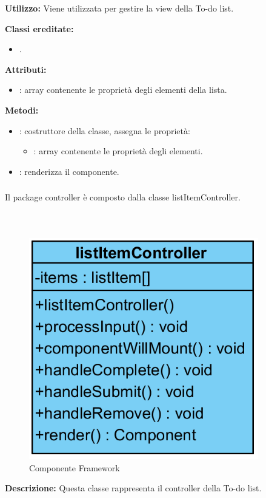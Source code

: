 \textbf{Utilizzo:}
Viene utilizzata per gestire la view della To-do list.

\textbf{Classi ereditate:}
\begin{itemize}
	\item {}.
\end{itemize}

\textbf{Attributi:}
\begin{itemize}
	\item {}: array contenente le proprietà degli elementi della lista.
\end{itemize}

\textbf{Metodi:}
\begin{itemize}
	\item {}: costruttore della classe, assegna le proprietà:
	\begin{itemize}
		\item {}: array contenente le proprietà degli elementi.
	\end{itemize}
	\item {}: renderizza il componente.
\end{itemize}

\subsubsection[::Controller]{\class} \label{\class}
Il package controller è composto dalla classe listItemController.


\subparagraph[::listItemController]{\class}\mbox{}\\ \label{\class}
\begin{figure}[H]
	\centering
	\includegraphics[width=10cm]{./diagrammi/todo/list_item_controller.png}
	\caption{Componente Framework}
\end{figure}
\textbf{Descrizione:}
Questa classe rappresenta il controller della To-do list.

